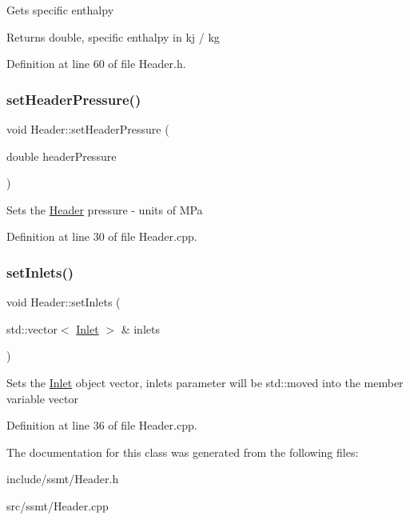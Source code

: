 Gets specific enthalpy \begin{DoxyReturn}{Returns}
double, specific enthalpy in kj / kg 
\end{DoxyReturn}


Definition at line 60 of file Header.\+h.

\mbox{\label{class_header_a3af0b7964b74287ce0c662b9a88556ed}} 
\subsubsection{\texorpdfstring{set\+Header\+Pressure()}{setHeaderPressure()}}
{\footnotesize\ttfamily void Header\+::set\+Header\+Pressure (\begin{DoxyParamCaption}\item[{double}]{header\+Pressure }\end{DoxyParamCaption})}

Sets the \hyperlink{class_header}{Header} pressure -\/ units of M\+Pa 

Definition at line 30 of file Header.\+cpp.

\mbox{\label{class_header_ae69b6f894210a6cd340e92222f8bc343}} 
\subsubsection{\texorpdfstring{set\+Inlets()}{setInlets()}}
{\footnotesize\ttfamily void Header\+::set\+Inlets (\begin{DoxyParamCaption}\item[{std\+::vector$<$ \hyperlink{class_inlet}{Inlet} $>$ \&}]{inlets }\end{DoxyParamCaption})}

Sets the \hyperlink{class_inlet}{Inlet} object vector, inlets parameter will be std\+::moved into the member variable vector 

Definition at line 36 of file Header.\+cpp.



The documentation for this class was generated from the following files\+:\begin{DoxyCompactItemize}
\item 
include/ssmt/Header.\+h\item 
src/ssmt/Header.\+cpp\end{DoxyCompactItemize}
